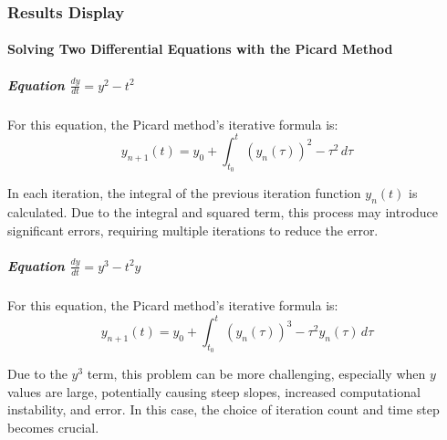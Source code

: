 \documentclass{article}
\begin{document}
\subsubsection{Results Display}

\paragraph{Solving Two Differential Equations with the Picard Method}

\subparagraph{Equation \( \frac{dy}{dt} = y^2 - t^2 \)}
For this equation, the Picard method's iterative formula is:
\[
y_{n+1}(t) = y_0 + \int_{t_0}^{t} (y_n(\tau))^2 - \tau^2 \, d\tau
\]

In each iteration, the integral of the previous iteration function \( y_n(t) \) is calculated. Due to the integral and squared term, this process may introduce significant errors, requiring multiple iterations to reduce the error.

\subparagraph{Equation \( \frac{dy}{dt} = y^3 - t^2 y \)}
For this equation, the Picard method's iterative formula is:
\[
y_{n+1}(t) = y_0 + \int_{t_0}^{t} (y_n(\tau))^3 - \tau^2 y_n(\tau) \, d\tau
\]

Due to the \( y^3 \) term, this problem can be more challenging, especially when \( y \) values are large, potentially causing steep slopes, increased computational instability, and error. In this case, the choice of iteration count and time step becomes crucial.

\clearpage
\end{document}
